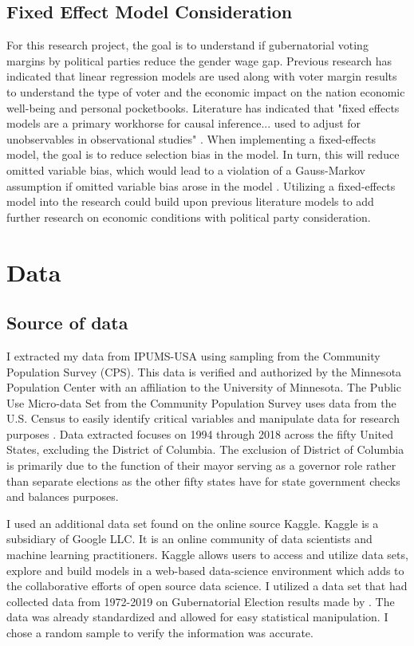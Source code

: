 \documentclass[12pt, English]{article}
\begin{document}
\subsection*{Fixed Effect Model Consideration}
For this research project, the goal is to understand if gubernatorial voting margins by political parties reduce the gender wage gap. Previous research has indicated that linear regression models are used along with voter margin results to understand the type of voter and the economic impact on the nation economic well-being and personal pocketbooks. Literature has indicated that "fixed effects models are a primary workhorse for causal inference... used to adjust for unobservables in observational studies" \citep{imai2012use}. When implementing a fixed-effects model, the goal is to reduce selection bias in the model. In turn, this will reduce omitted variable bias, which would lead to a violation of a Gauss-Markov assumption if omitted variable bias arose in the model \citep{mummolo2018improving}. Utilizing a fixed-effects model into the research could build upon previous literature models to add further research on economic conditions with political party consideration.



\newpage
\section{Data}
\subsection*{Source of data}
I extracted my data from IPUMS-USA using sampling from the Community Population Survey (CPS). This data is verified and authorized by the Minnesota Population Center with an affiliation to the University of Minnesota. The Public Use Micro-data Set from the Community Population Survey uses data from the U.S. Census to easily identify critical variables and manipulate data for research purposes \citep{IPUMSUSA}. Data extracted focuses on 1994 through 2018 across the fifty United States, excluding the District of Columbia. The exclusion of District of Columbia is primarily due to the function of their mayor serving as a governor role rather than separate elections as the other fifty states have for state government checks and balances purposes. 

I used an additional data set found on the online source Kaggle. Kaggle is a subsidiary of Google LLC. It is an online community of data scientists and machine learning practitioners. Kaggle allows users to access and utilize data sets, explore and build models in a web-based data-science environment which adds to the collaborative efforts of open source data science. I utilized a data set that had collected data from 1972-2019 on Gubernatorial Election results made by \citep{KAGGLE}. The data was already standardized and allowed for easy statistical manipulation. I chose a random sample to verify the information was accurate. 
\end{document}
